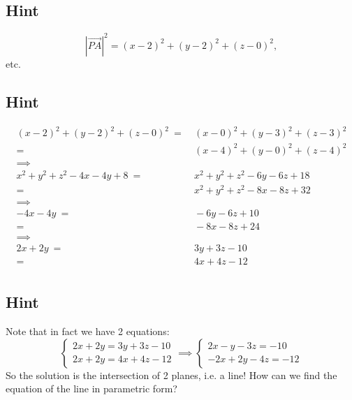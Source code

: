 \documentclass[a4paper,10pt]{article}
\begin{document}
\subsection{Hint}
\[
    \left|\overrightarrow{PA}\right|^2 = (x-2)^2 + (y-2)^2 +(z-0)^2,
\]
etc.

\subsection{Hint}
\begin{align*}
    (x-2)^2 + (y-2)^2 + (z-0)^2\ =    & \ (x-0)^2 + (y-3)^2 + (z-3)^2    \\
    =                                 & \ (x-4)^2 + (y-0)^2 + (z-4)^2    \\
    \implies                          &                                  \\
    x^2 + y^2 + z^2 - 4x - 4y + 8\  = & \ x^2 + y^2 + z^2 - 6y - 6z + 18 \\
    =                                 & \ x^2 + y^2 + z^2 - 8x - 8z + 32 \\
    \implies                          &                                  \\
    - 4x - 4y\ =                      & \ - 6y - 6z + 10                 \\
    =                                 & \ - 8x - 8z + 24                 \\
    \implies                          &                                  \\
    2x + 2y\ =                        & \ 3y + 3z - 10                   \\
    =                                 & \ 4x + 4z - 12                   \\
\end{align*}

\subsection{Hint}
Note that in fact we have 2 equations:
\[
    \begin{cases}
        2x + 2y = 3y + 3z - 10 \\
        2x + 2y = 4x + 4z - 12
    \end{cases} \implies \begin{cases}
        2x - y - 3z = -10 \\
        -2x + 2y - 4z = -12
    \end{cases}
\]
So the solution is the intersection of 2 planes, i.e. a line! How can we find the equation of the line in parametric form?
\end{document}
